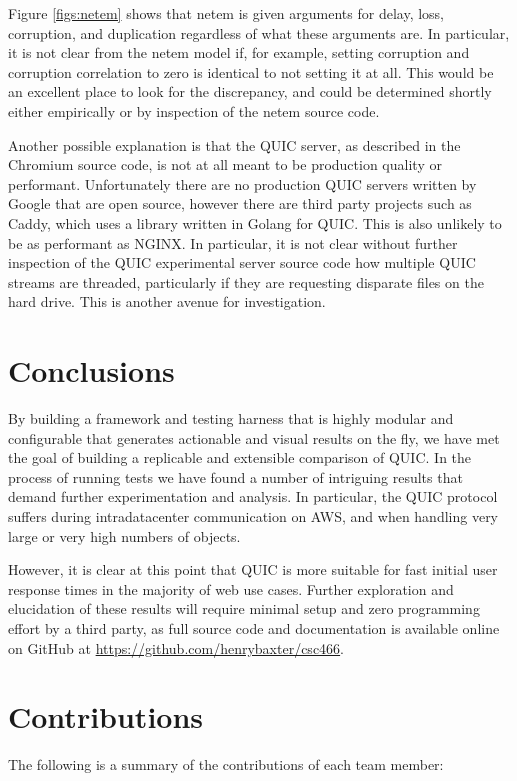 \documentclass[12pt]{article}
\begin{document}
Figure \ref{figs:netem} shows that netem is given arguments for delay, loss, corruption, and duplication regardless of what these arguments are. In particular, it is not clear from the netem model if, for example, setting corruption and corruption correlation to zero is identical to not setting it at all. This would be an excellent place to look for the discrepancy, and could be determined shortly either empirically or by inspection of the netem source code.

Another possible explanation is that the QUIC server, as described in the Chromium source code, is not at all meant to be production quality or performant. Unfortunately there are no production QUIC servers written by Google that are open source, however there are third party projects such as Caddy, which uses a library written in Golang for QUIC. This is also unlikely to be as performant as NGINX. In particular, it is not clear without further inspection of the QUIC experimental server source code how multiple QUIC streams are threaded, particularly if they are requesting disparate files on the hard drive. This is another avenue for investigation.

\section{Conclusions}
\label{conclusions}
By building a framework and testing harness that is highly modular and configurable that generates actionable and visual results on the fly, we have met the goal of building a replicable and extensible comparison of QUIC. In the process of running tests we have found a number of intriguing results that demand further experimentation and analysis. In particular, the QUIC protocol suffers during intradatacenter communication on AWS, and when handling very large or very high numbers of objects.

However, it is clear at this point that QUIC is more suitable for fast initial user response times in the majority of web use cases. Further exploration and elucidation of these results will require minimal setup and zero programming effort by a third party, as full source code and documentation is available online on GitHub at \url{https://github.com/henrybaxter/csc466}.

\appendix

\clearpage

\section{Contributions}
The following is a summary of the contributions of each team member:
\end{document}
